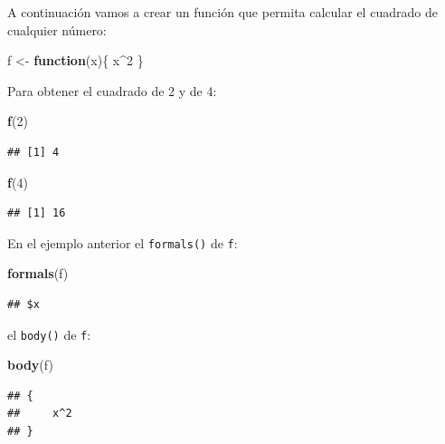 \documentclass[12pt,]{book}
\newenvironment{Shaded}{\begin{snugshade}}{\end{snugshade}}
\newcommand{\KeywordTok}[1]{\textcolor[rgb]{0.13,0.29,0.53}{\textbf{#1}}}
\newcommand{\DecValTok}[1]{\textcolor[rgb]{0.00,0.00,0.81}{#1}}
\newcommand{\StringTok}[1]{\textcolor[rgb]{0.31,0.60,0.02}{#1}}
\newcommand{\ControlFlowTok}[1]{\textcolor[rgb]{0.13,0.29,0.53}{\textbf{#1}}}
\newcommand{\OperatorTok}[1]{\textcolor[rgb]{0.81,0.36,0.00}{\textbf{#1}}}
\newcommand{\NormalTok}[1]{#1}
\begin{document}
A continuación vamos a crear un función que permita calcular el cuadrado
de cualquier número:

\begin{Shaded}
\begin{Highlighting}[]
\NormalTok{f <-}\StringTok{ }\ControlFlowTok{function}\NormalTok{(x)\{}
\NormalTok{    x}\OperatorTok{^}\DecValTok{2}
\NormalTok{\}}
\end{Highlighting}
\end{Shaded}

Para obtener el cuadrado de 2 y de 4:

\begin{Shaded}
\begin{Highlighting}[]
\KeywordTok{f}\NormalTok{(}\DecValTok{2}\NormalTok{)}
\end{Highlighting}
\end{Shaded}

\begin{verbatim}
## [1] 4
\end{verbatim}

\begin{Shaded}
\begin{Highlighting}[]
\KeywordTok{f}\NormalTok{(}\DecValTok{4}\NormalTok{)}
\end{Highlighting}
\end{Shaded}

\begin{verbatim}
## [1] 16
\end{verbatim}

En el ejemplo anterior el \texttt{formals()} de \texttt{f}:

\begin{Shaded}
\begin{Highlighting}[]
\KeywordTok{formals}\NormalTok{(f)}
\end{Highlighting}
\end{Shaded}

\begin{verbatim}
## $x
\end{verbatim}

el \texttt{body()} de \texttt{f}:

\begin{Shaded}
\begin{Highlighting}[]
\KeywordTok{body}\NormalTok{(f)}
\end{Highlighting}
\end{Shaded}

\begin{verbatim}
## {
##     x^2
## }
\end{verbatim}
\end{document}
